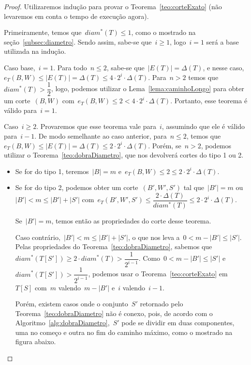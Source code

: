 \documentclass[a4paper,12pt]{article}
\begin{document}
	\begin{proof}
		Utilizaremos indução para provar o 
		Teorema~\ref{teo:corteExato} 
		(não levaremos em conta o tempo de execução agora).
		
		Primeiramente, temos que~$diam^*(T)\le1$, como o mostrado 
		na seção~\ref{subsec:diametro}. 
		Sendo assim, sabe-se que~$i\ge1$, logo~$i=1$ será a base 
		utilizada na indução.
		
		Caso base,~$i=1$.
		Para todo~$n\le 2$, sabe-se que~$|E(T)|=\Delta(T)$, e nesse
		caso,~$e_T(B,W)\le |E(T)|=\Delta(T)\le 4\cdot 2^i\cdot 
		\Delta(T)$.
		Para~$n>2$ temos que~$diam^*(T)>\dfrac{1}{2}$, logo, 
		podemos utilizar o Lema~\ref{lema:caminhoLongo} para obter 
		um corte~$(B,W)$ 
		com~$e_T(B,W)\le 2 < 4\cdot 2^i\cdot \Delta(T)$.
		Portanto, esse teorema é válido para~$i=1$.


		Caso~$i\ge 2$. Provaremos que esse teorema vale para~$i$, 
		assumindo que ele é válido para~$i-1$.
		De modo semelhante ao caso anterior, para~$n\le2$, temos 
		que~$e_T(B,W)\le |E(T)|=\Delta(T)\le 2\cdot 2^i\cdot 
		\Delta(T)$.
		Porém, se~$n>2$, podemos utilizar o 
		Teorema~\ref{teo:dobraDiametro}, que nos devolverá cortes 
		do tipo 1 ou 2.
		\begin{itemize}
			\item Se for do tipo 1, teremos~$|B|=m$ 
			e~$e_T(B,W)\le2\le 2\cdot 2^i\cdot \Delta(T)$.

			\item Se for do tipo 2, podemos obter um 
			corte~$(B',W',S')$
			tal que~$|B'|=m$ ou~$|B'|<m\le |B'|+|S'|$
			com~$e_T(B',W',S')\le \dfrac{2\cdot 
			\Delta(T)}{diam^*(T)}\le
			2\cdot2^i\cdot\Delta(T)$.
			
			Se~$|B'|=m$, temos então as propriedades do corte desse
			teorema.

			Caso contrário,~$|B'|<m\le |B'|+|S'|$, o que nos leva 
			a~$0<m-|B'|\le|S'|$. 
			Pelas propriedades do Teorema~\ref{teo:dobraDiametro}, 
			sabemos que~$diam^*(T[S'])\ge 2\cdot diam^*(T)>
			\dfrac{1}{2^{i-1}}$.
			Como~$0<m-|B'|\le|S'|$ e~$diam^*(T[S'])>
			\dfrac{1}{2^{i-1}}$, podemos usar o 
			Teorema~\ref{teo:corteExato} em~$T[S]$ com~$m$ 
			valendo~$m-|B'|$ e~$i$ valendo~$i-1$.
			
			Porém, existem casos onde o conjunto~$S'$ retornado 
			pelo Teorema~\ref{teo:dobraDiametro} não é conexo, 
			pois, de acordo com o 
			Algoritmo~\ref{alg:dobraDiametro},~$S'$ pode se 
			dividir em duas componentes, uma no começo e outra
			no fim do caminho máximo, como o mostrado na figura 
			abaixo. 



\end{itemize}
\end{proof}
\end{document}
